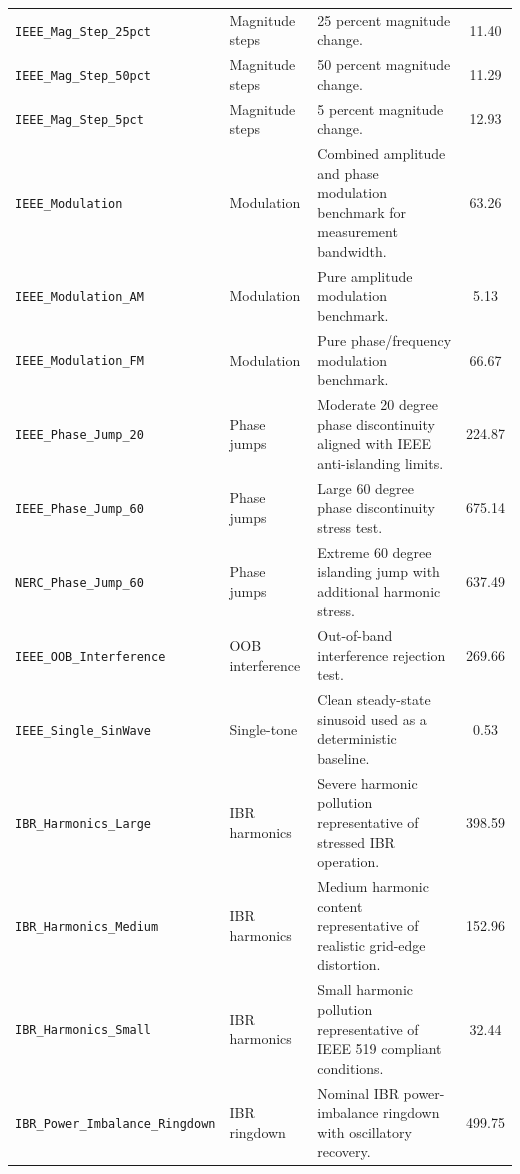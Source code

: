 \begin{longtable}{L{3.2cm} L{1.9cm} L{6.8cm} c}
\texttt{IEEE\allowbreak\_Mag\allowbreak\_Step\allowbreak\_25pct} & Magnitude steps & 25 percent magnitude change. & 11.40 \\
\texttt{IEEE\allowbreak\_Mag\allowbreak\_Step\allowbreak\_50pct} & Magnitude steps & 50 percent magnitude change. & 11.29 \\
\texttt{IEEE\allowbreak\_Mag\allowbreak\_Step\allowbreak\_5pct} & Magnitude steps & 5 percent magnitude change. & 12.93 \\
\texttt{IEEE\allowbreak\_Modulation} & Modulation & Combined amplitude and phase modulation benchmark for measurement bandwidth. & 63.26 \\
\texttt{IEEE\allowbreak\_Modulation\allowbreak\_AM} & Modulation & Pure amplitude modulation benchmark. & 5.13 \\
\texttt{IEEE\allowbreak\_Modulation\allowbreak\_FM} & Modulation & Pure phase/frequency modulation benchmark. & 66.67 \\
\texttt{IEEE\allowbreak\_Phase\allowbreak\_Jump\allowbreak\_20} & Phase jumps & Moderate 20 degree phase discontinuity aligned with IEEE anti-islanding limits. & 224.87 \\
\texttt{IEEE\allowbreak\_Phase\allowbreak\_Jump\allowbreak\_60} & Phase jumps & Large 60 degree phase discontinuity stress test. & 675.14 \\
\texttt{NERC\allowbreak\_Phase\allowbreak\_Jump\allowbreak\_60} & Phase jumps & Extreme 60 degree islanding jump with additional harmonic stress. & 637.49 \\
\texttt{IEEE\allowbreak\_OOB\allowbreak\_Interference} & OOB interference & Out-of-band interference rejection test. & 269.66 \\
\texttt{IEEE\allowbreak\_Single\allowbreak\_SinWave} & Single-tone & Clean steady-state sinusoid used as a deterministic baseline. & 0.53 \\
\texttt{IBR\allowbreak\_Harmonics\allowbreak\_Large} & IBR harmonics & Severe harmonic pollution representative of stressed IBR operation. & 398.59 \\
\texttt{IBR\allowbreak\_Harmonics\allowbreak\_Medium} & IBR harmonics & Medium harmonic content representative of realistic grid-edge distortion. & 152.96 \\
\texttt{IBR\allowbreak\_Harmonics\allowbreak\_Small} & IBR harmonics & Small harmonic pollution representative of IEEE 519 compliant conditions. & 32.44 \\
\texttt{IBR\allowbreak\_Power\allowbreak\_Imbalance\allowbreak\_Ringdown} & IBR ringdown & Nominal IBR power-imbalance ringdown with oscillatory recovery. & 499.75 \\

\end{longtable}
